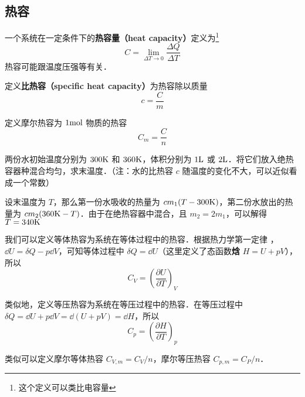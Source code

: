 
\begin{issues}
\issueTODO
\end{issues}
\subsection{热容}
一个系统在一定条件下的\textbf{热容量（heat capacity）}定义为\footnote{这个定义可以类比电容量}
\begin{equation}
C = \lim\limits_{\Delta T\rightarrow 0}\frac{\Delta Q}{\Delta T}
\end{equation}
热容可能跟温度压强等有关．

定义\textbf{比热容（specific heat capacity）}为热容除以质量
\begin{equation}
c = \frac{C}{m}
\end{equation}

定义摩尔热容为 $1 \rm{mol}$ 物质的热容
\begin{equation}
C_m=\frac{C}{n}
\end{equation}

\begin{example}{}
两份水初始温度分别为 $300\rm{K}$ 和 $360\rm{K}$，体积分别为 $1\rm{L}$ 或 $2 \rm{L}$．将它们放入绝热容器种混合均匀，求末温度．（注：水的比热容 $c$ 随温度的变化不大，可以近似看成一个常数）

设末温度为 $T$，那么第一份水吸收的热量为 $c m_1(T-300\rm{K})$，第二份水放出的热量为 $cm_2(360{\rm{K}}-T)$．由于在绝热容器中混合，且 $m_2=2m_1$，可以解得 $T=340\rm{K}$
\end{example}

我们可以定义等体热容为系统在等体过程中的热容．根据热力学第一定律 ，$\dd U=\delta Q-p\dd V$，可知等体过程中 $\delta Q=\dd U$（这里定义了态函数\textbf{焓} $H=U+pV$），所以
\begin{equation}\label{ThCapa_eq1}
C_V=\left(\frac{\partial U}{\partial T}\right)_V
\end{equation}

类似地，定义等压热容为系统在等压过程中的热容．在等压过程中 $\delta Q=\dd U+p\dd V=\dd (U+pV)=\dd H$，所以
\begin{equation}
C_p=\left(\frac{\partial H}{\partial T}\right)_p
\end{equation}

类似可以定义摩尔等体热容 $C_{V,m}=C_V/n$，摩尔等压热容 $C_{p,m}=C_P/n$．

